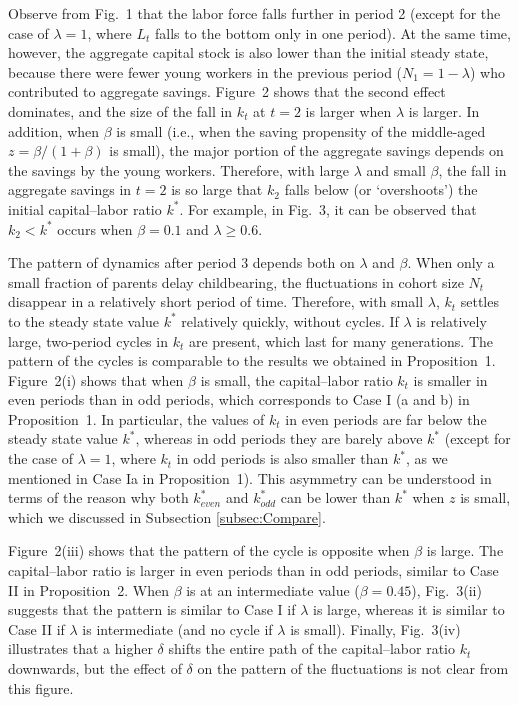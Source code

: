 \documentclass[nogrid]{MBE}%
\begin{document}
{Observe from Fig.~1 that the labor force falls further in period 2 (except for the case of
$\lambda=1$, where $L_{t}$ falls to the bottom only in one period). At the same time, however, the
aggregate capital stock is also lower than the initial steady state, because there were fewer
young workers in the previous period ($N_{1}=1-\lambda$) who contributed to aggregate savings.
Figure~2 shows that the second effect dominates, and the size of the fall in $k_{t}$ at $t=2$ is
larger when $\lambda$ is larger. In addition, when $\beta$ is small (i.e., when the saving
propensity of the middle-aged $z=\beta/(1+\beta)$ is small), the major portion of the aggregate
savings depends on the savings by the young workers. Therefore, with large $\lambda$ and small
$\beta$, the fall in aggregate savings in $t=2$ is so large that $k_{2}$ falls below (or
`overshoots') the initial capital--labor ratio $k^{\ast}$. {For example, in Fig.~3, it can be
observed that $k_{2}<k^{\ast}$ occurs when $\beta=0.1$ and $\lambda\geq0.6$.}

The pattern of dynamics after period 3 depends both on $\lambda$ and $\beta$. When only a small
fraction of parents delay childbearing, the fluctuations in cohort size $N_{t}$ disappear in a
relatively short period of time. Therefore, with small $\lambda$, $k_{t}$ settles to the steady
state value $k^{\ast}$ relatively quickly, without cycles. If $\lambda$ is relatively large,
two-period cycles in $k_{t}$ are present, which last for many generations. The pattern of the
cycles is comparable to the results we obtained in Proposition~1. Figure~2(i) shows that when
$\beta$ is small, the capital--labor ratio $k_{t}$ is smaller in even periods than in odd periods,
which corresponds to Case I (a and b) in Proposition~1. In particular, the values of $k_{t}$ in
even periods are far below the steady state value $k^{\ast}$, whereas in odd periods they are
barely above $k^{\ast}$ (except for the case of $\lambda=1$, where $k_{t}$ in odd periods is also
smaller than $k^{\ast}$, as we mentioned in Case Ia in Proposition~1). This asymmetry can be
understood in terms of the reason why both $k_{even}^{\ast}$ and $k_{odd}^{\ast}$ can be lower
than $k^{\ast}$ when $z$ is small, which we discussed in Subsection \ref{subsec:Compare}.

Figure~2(iii) shows that the pattern of the cycle is opposite when $\beta$ is large. The
capital--labor ratio is larger in even periods than in odd periods, similar to Case II in
Proposition~2. When $\beta$ is at an intermediate value ($\beta =0.45$), Fig.~3(ii) suggests that
the pattern is similar to Case I if $\lambda$ is large, whereas it is similar to Case II if
$\lambda$ is intermediate (and no cycle if $\lambda$ is small). Finally, Fig.~3(iv) illustrates
that a higher $\delta$ shifts the entire path of the capital--labor ratio $k_{t}$ downwards, but
the effect of $\delta$ on the pattern of the fluctuations is not clear from this figure.

}
\end{document}
